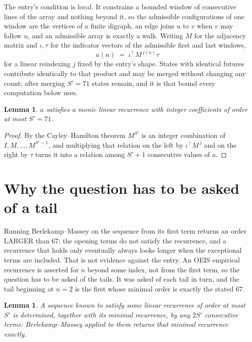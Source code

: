 \documentclass[11pt,a4paper]{article}
\theoremstyle{plain}
\newtheorem{lemma}[theorem]{Lemma}
\theoremstyle{definition}
\begin{document}
The entry's condition is local. It constrains a bounded window of consecutive lines of the
array and nothing beyond it, so the admissible configurations of one window are the vertices of
a finite digraph, an edge joins $u$ to $v$ when $v$ may follow $u$, and an admissible array is
exactly a walk. Writing $M$ for the adjacency matrix and $\iota,\tau$ for the indicator vectors
of the admissible first and last windows,
\[
a(n)\;=\;\iota^{\!\top}M^{\,j(n)}\tau
\]
for a linear reindexing $j$ fixed by the entry's shape. States with identical futures
contribute identically to that product and may be merged without changing any count; after
merging $S'=71$ states remain, and it is that bound every computation below uses.

\begin{lemma}\label{lem:cf}
$a$ satisfies a monic linear recurrence with integer coefficients of order at most $S'=71$.
\end{lemma}

\begin{proof}
By the Cayley--Hamilton theorem $M^{S'}$ is an integer combination of $I,M,\dots,M^{S'-1}$,
and multiplying that relation on the left by $\iota^{\!\top}M^{\,j}$ and on the right by
$\tau$ turns it into a relation among $S'+1$ consecutive values of $a$.
\end{proof}

\section{Why the question has to be asked of a tail}

Running Berlekamp--Massey on the sequence from its first term returns an order LARGER than $67$: the opening terms do not satisfy the recurrence, and a recurrence that holds only eventually always looks longer when the exceptional terms are included. That is not evidence against the entry. An OEIS empirical recurrence is asserted for $n$ beyond some index, not from the first term, so the question has to be asked of the tails. It was asked of each tail in turn, and the tail beginning at $n=2$ is the first whose minimal order is exactly the stated $67$.

\begin{lemma}\label{lem:bm}
A sequence known to satisfy some linear recurrence of order at most $S'$ is determined,
together with its minimal recurrence, by any $2S'$ consecutive terms: Berlekamp--Massey applied
to them returns that minimal recurrence exactly.
\end{lemma}
\end{document}
